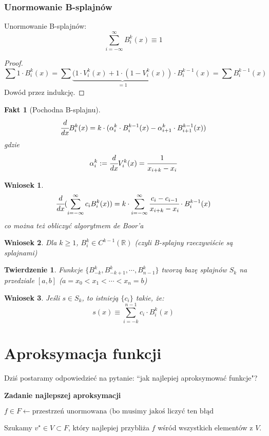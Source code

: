 \documentclass[hidelinks,a4paper,fleqn,oneside]{book}
\newcommand{\RR}{\mathbb{R}}
\newcommand{\la}{\leftarrow}
\newtheorem{wniosek}{Wniosek}
\newtheorem{fakt}{Fakt}
\newtheorem{twierdz}{Twierdzenie}
\begin{document}
\subsubsection{Unormowanie B-splajnów}
Unormowanie B-splajnów: 
\[
	\sum_{i=-\infty}^{\infty} B_i^k(x) \equiv 1
\]

\begin{proof}
\[
\sum 1 \cdot B_i^k(x) = \sum \underbrace{(1 \cdot V_i^k(x) + 1 \cdot (1-V_i^k(x))}_{=1} \cdot B_i^{k-1}(x) = \sum B_i^{k-1}(x)
\]
Dowód przez indukcję.
\end{proof}

\begin{fakt}[Pochodna B-splajnu]
	\[
		\cfrac{d}{dx} B_i^k(x) = k \cdot (\alpha_i^k \cdot B_i^{k-1}(x) - \alpha_{i+1}^k \cdot B_{i+1}^{k-1}(x))
	\]
	gdzie
	\[
		\alpha_i^k := \cfrac{d}{dx}V_i^k(x) = \cfrac{1}{x_{i+k} - x_i}
	\]
\end{fakt}
\begin{wniosek}
	\[
		\cfrac{d}{dx}(\sum_{i=-\infty}^{\infty} c_i B_i^k(x)) = k \cdot \sum_{i=-\infty}^{\infty} \cfrac{c_i - c_{i-1}}{x_{i+k}-x_i} \cdot B_i^{k-1}(x)
	\]
	co można też obliczyć algorytmem de Boor'a
\end{wniosek}
\begin{wniosek}
	Dla $k \geq 1$, $B_i^k \in C^{k-1}(\RR)$ (czyli B-splajny rzeczywiście są splajnami)
\end{wniosek}

\begin{twierdz}
	Funkcje $\{B_{-k}^k, B_{-k+1}^k, \cdots, B_{n-1}^{k}\}$ tworzą bazę splajnów $S_k$ na przedziale $[a, b]$ ($a = x_0 < x_1 < \cdots < x_n = b$)
\end{twierdz}
\begin{wniosek}
	Jeśli $s \in S_k$, to istnieją $\{c_i\}$ takie, że:
	\[
		s(x) \equiv \sum_{i=-k}^{n-1} c_i \cdot B_i^k(x)
	\]
\end{wniosek}

\section{Aproksymacja funkcji}
Dziś postaramy odpowiedzieć na pytanie: ``jak najlepiej aproksymować funkcje"?

\textbf{Zadanie najlepszej aproksymacji}

$f \in F \la \textrm{przestrzeń unormowana (bo musimy jakoś liczyć ten błąd}$

Szukamy $v^\star \in V \subset F$, który najlepiej przybliża $f$ wśród wszystkich elementów z $V$.
\end{document}
